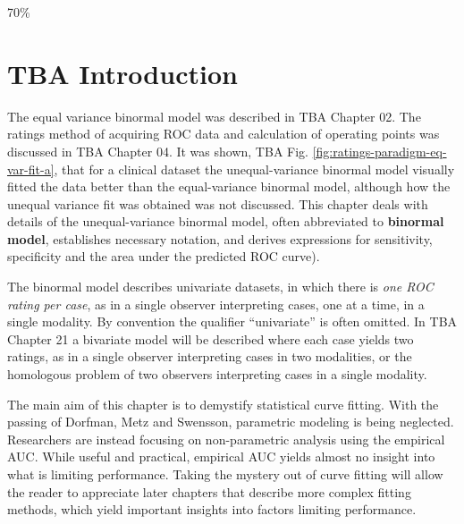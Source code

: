 \documentclass[
]{book}
\begin{document}
70\%

\hypertarget{binormal-model-introduction}{%
\section{TBA Introduction}\label{binormal-model-introduction}}

The equal variance binormal model was described in TBA Chapter 02. The ratings method of acquiring ROC data and calculation of operating points was discussed in TBA Chapter 04. It was shown, TBA Fig. \ref{fig:ratings-paradigm-eq-var-fit-a}, that for a clinical dataset the unequal-variance binormal model visually fitted the data better than the equal-variance binormal model, although how the unequal variance fit was obtained was not discussed. This chapter deals with details of the unequal-variance binormal model, often abbreviated to \textbf{binormal model}, establishes necessary notation, and derives expressions for sensitivity, specificity and the area under the predicted ROC curve).

The binormal model describes univariate datasets, in which there is \emph{one ROC rating per case}, as in a single observer interpreting cases, one at a time, in a single modality. By convention the qualifier ``univariate'' is often omitted. In TBA Chapter 21 a bivariate model will be described where each case yields two ratings, as in a single observer interpreting cases in two modalities, or the homologous problem of two observers interpreting cases in a single modality.

The main aim of this chapter is to demystify statistical curve fitting. With the passing of Dorfman, Metz and Swensson, parametric modeling is being neglected. Researchers are instead focusing on non-parametric analysis using the empirical AUC. While useful and practical, empirical AUC yields almost no insight into what is limiting performance. Taking the mystery out of curve fitting will allow the reader to appreciate later chapters that describe more complex fitting methods, which yield important insights into factors limiting performance.
\end{document}
